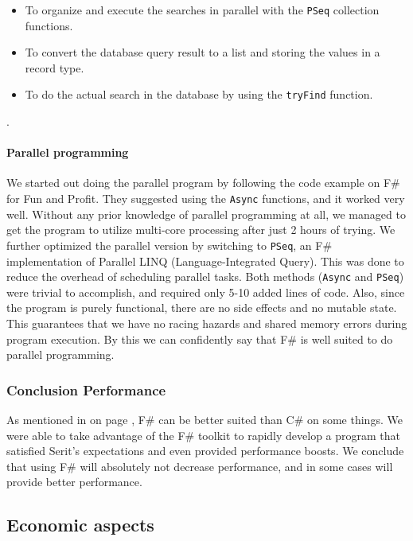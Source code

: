 \documentclass[12pt, a4paper]{article}
\newcommand{\code}[1]{{\small \texttt{#1}}}
\begin{document}
\begin{itemize}
	\item To organize and execute the searches in parallel with the \code{PSeq} collection functions.
	\item To convert the database query result to a list and storing the values in a record type.
	\item To do the actual search in the database by using the \code{tryFind} function.
\end{itemize}.

\paragraph{Parallel programming} We started out doing the parallel program by following the code example on F\# for Fun and Profit. They suggested using the \code{Async} functions, and it worked very well. Without any prior knowledge of parallel programming at all, we managed to get the program to utilize multi-core processing after just 2 hours of trying. We further optimized the parallel version by switching to \code{PSeq}, an F\# implementation of Parallel LINQ (Language-Integrated Query). This was done to reduce the overhead of scheduling parallel tasks. Both methods (\code{Async} and \code{PSeq}) were trivial to accomplish, and required only 5-10 added lines of code. Also, since the program is purely functional, there are no side effects and no mutable state. This guarantees that we have no racing hazards and shared memory errors during program execution. By this we can confidently say that F\# is well suited to do parallel programming.

\subsubsection{Conclusion Performance}
As mentioned in  on page \pageref{sTranslatePerformance}, F\# can be better suited than C\# on some things. We were able to take advantage of the F\# toolkit to rapidly develop a program that satisfied Serit's expectations and even provided performance boosts. We conclude that using F\# will absolutely not decrease performance, and in some cases will provide better performance.

\newpage

\subsection{Economic aspects}
\end{document}
